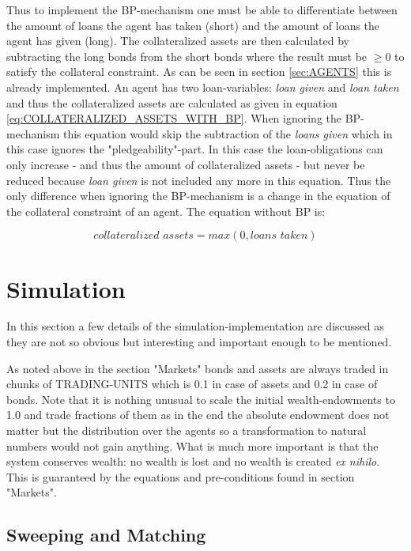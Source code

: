 \documentclass[Bachelorarbeit.tex]{subfiles}
\begin{document}
Thus to implement the BP-mechanism one must be able to differentiate between the amount of loans the agent has taken (short) and the amount of loans the agent has given (long). The collateralized assets are then calculated by subtracting the long bonds from the short bonds where the result must be $\geq 0$ to satisfy the collateral constraint. As can be seen in section \ref{sec:AGENTS} this is already implemented. An agent has two loan-variables: \textit{loan given} and \textit{loan taken} and thus the collateralized assets are calculated as given in equation \ref{eq:COLLATERALIZED_ASSETS_WITH_BP}.
\medskip
When ignoring the BP-mechanism this equation would skip the subtraction of the \textit{loans given} which in this case ignores the "pledgeability"-part. In this case the loan-obligations can only increase - and thus the amount of collateralized assets - but never be reduced because \textit{loan given} is not included any more in this equation. Thus the only difference when ignoring the BP-mechanism is a change in the equation of the collateral constraint of an agent. The equation without BP is:

\begin{equation}
\textit{collateralized assets} = max(0, \textit{loans taken})
\label{eq:COLLATERALIZED_ASSETS_WITHOUT_BP}
\end{equation}

\section{Simulation}
In this section a few details of the simulation-implementation are discussed as they are not so obvious but interesting and important enough to be mentioned.

\medskip

As noted above in the section "Markets" bonds and assets are always traded in chunks of TRADING-UNITS which is 0.1 in case of assets and 0.2 in case of bonds. Note that it is nothing unusual to scale the initial wealth-endowments to 1.0 and trade fractions of them as in the end the absolute endowment does not matter but the distribution over the agents so a transformation to natural numbers would not gain anything. What is much more important is that the system conserves wealth: no wealth is lost and no wealth is created \textit{ex nihilo}. This is guaranteed by the equations and pre-conditions found in section "Markets". 

\subsection{Sweeping and Matching}
\label{sec:implementation_sweepingAndMatching}
\end{document}

